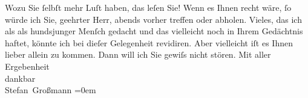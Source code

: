 \begin{ledgroupsized}[t]{13cm}
           \pstart
           Wozu Sie ſelbſt mehr Luſt haben, das leſen Sie!\pend
           \pstart
           Wenn es Ihnen recht wäre, ſo würde ich Sie, geehrter Herr, abends vorher treffen oder
               abholen.\pend
           \pstart
           Vieles, das ich als als hundsjunger Menſch gedacht und das vielleicht noch in Ihrem
                  {\pb}Gedächtnis haftet,
               könnte ich bei dieſer Gelegenheit revidiren. Aber vielleicht iſt es Ihnen lieber
               allein zu kommen. Dann will ich Sie gewiſs nicht stören.\pend
           \pstart
           Mit aller Ergebenheit{\\[\baselineskip]}dankbar{\\[\baselineskip]}\spacefill\mbox{Stefan Großmann}\pend
           \leftskip=0em{}
         
         \endnumbering{}\end{ledgroupsized}  \newcommand{\dateiname}{L01722}\newcommand{\titel}{Stefan Großmann an Arthur Schnitzler, 12. 10. 1907}\newcommand{\editorInnen}{ Martin Anton Müller und Gerd-Hermann Susen}
      